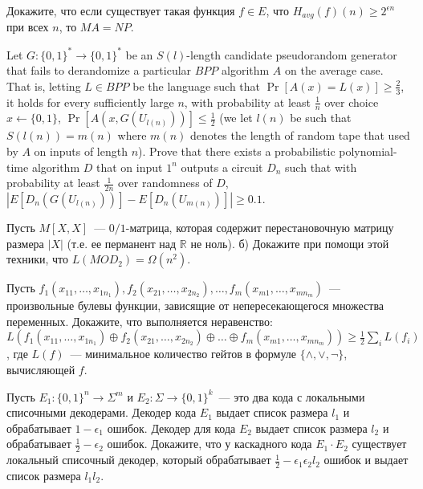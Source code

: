 \setcounter{curtask}{28}


\begin{task}
    Докажите, что если существует такая функция $f \in E$, что $H_{avg}(f)(n) \ge 2^{\epsilon n}$ при всех $n$, то $MA = NP$.
\end{task}

\begin{task}
	Let $G: \{0, 1\}^{*} \rightarrow \{0, 1\}^{*}$ be an $S(l)$-length candidate pseudorandom generator that fails to derandomize
    a particular $BPP$ algorithm $A$ on the average case. That is, letting $L \in BPP$ be the language such that $\Pr[A(x) = L(x)]
    \ge \frac{2}{3}$, it holds for every sufficiently large $n$, with probability at least $\frac{1}{n}$ over choice $x \gets \{0,
    1\}$, $\Pr[A(x, G(U_{l(n)}))] \le \frac{1}{2}$ (we let $l(n)$ be such that $S(l(n)) = m(n)$ where $m(n)$ denotes the length of
    random tape that used by $A$ on inputs of length $n$). Prove that there exists a probabilistic polynomial-time algorithm $D$
    that on input $1^{n}$ outputs a circuit $D_n$ such that with probability at least $\frac{1}{2n}$ over randomness of $D$,
    $|E[D_n(G(U_{l(n)}))] - E[D_n(U_{m(n)})]| \ge 0.1$.
\end{task}


\breakline


\begin{ptask}{19}
    Пусть $M[X, X]$~--- $0 / 1$-матрица, которая содержит перестановочную матрицу размера $|X|$ (т.е. ее перманент над
    $\mathbb{R}$ не ноль). б) Докажите при помощи этой техники, что $L(MOD_2) = \Omega(n^2)$.
\end{ptask}

\begin{ptask}{21}
    Пусть $f_1(x_{1 1}, \dots, x_{1 n_1}), f_2(x_{2 1}, \dots, x_{2 n_2}), \dots, f_m(x_{m 1}, \dots, x_{m n_m})$~--- произвольные
    булевы функции, зависящие от непересекающегося множества переменных. Докажите, что выполняется неравенство:\\
    $L(f_1(x_{1 1}, \dots, x_{1 n_1}) \oplus f_2(x_{2 1}, \dots, x_{2 n_2}) \oplus \dots \oplus f_m(x_{m 1}, \dots, x_{m n_m}))
    \ge \frac{1}{2} \sum\limits_{i} L(f_i)$, где $L(f)$~--- минимальное количество гейтов в формуле $\{\land, \lor, \neg\}$,
    вычисляющей $f$.
\end{ptask}

\begin{ptask}{26}
    Пусть $E_1: \{0, 1\}^n \rightarrow \Sigma^m$ и $E_2: \Sigma \rightarrow \{0, 1\}^k$~--- это два кода с локальными списочными
    декодерами. Декодер кода $E_1$ выдает список размера $l_1$ и обрабатывает $1 - \epsilon_1$ ошибок. Декодер для кода $E_2$
    выдает список размера $l_2$ и обрабатывает $\frac{1}{2} - \epsilon_2$ ошибок. Докажите, что у каскадного кода $E_1 \cdot E_2$
    существует локальный списочный декодер, который обрабатывает $\frac{1}{2} - \epsilon_1 \epsilon_2 l_2$ ошибок и выдает список
    размера $l_1 l_2$.
\end{ptask}

